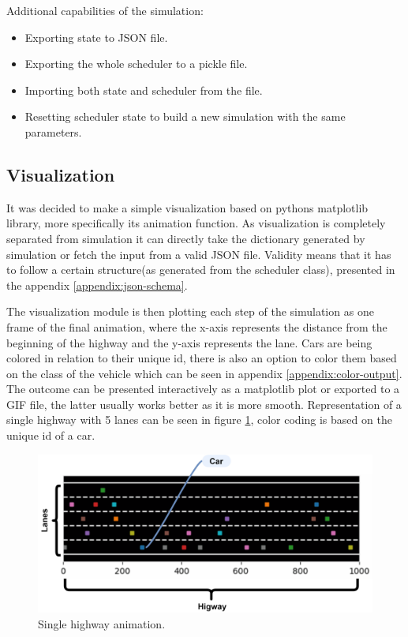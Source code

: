 Additional capabilities of the simulation:
\begin{itemize}
    \item Exporting state to JSON file.
    \item Exporting the whole scheduler to a pickle file.
    \item Importing both state and scheduler from the file.
    \item Resetting scheduler state to build a new simulation with the same parameters.
\end{itemize}

\subsection{Visualization}
It was decided to make a simple visualization based on pythons matplotlib library\cite{Hunter:2007}, more specifically its animation function. As visualization is completely separated from simulation it can directly take the dictionary generated by simulation or fetch the input from a valid JSON file. Validity means that it has to follow a certain structure(as generated from the scheduler class), presented in the appendix \ref{appendix:json-schema}.

The visualization module is then plotting each step of the simulation as one frame of the final animation, where the x-axis represents the distance from the beginning of the highway and the y-axis represents the lane. Cars are being colored in relation to their unique id, there is also an option to color them based on the class of the vehicle which can be seen in appendix \ref{appendix:color-output}. The outcome can be presented interactively as a matplotlib plot or exported to a GIF file, the latter usually works better as it is more smooth. Representation of a single highway with 5 lanes can be seen in figure \ref{fig:single-highway}, color coding is based on the unique id of a car.

\begin{figure}[H]
    \centering
    \includegraphics[width=\linewidth]{images/single-highwa.png}
    \caption{Single highway animation.}
    \label{fig:single-highway}
\end{figure}

